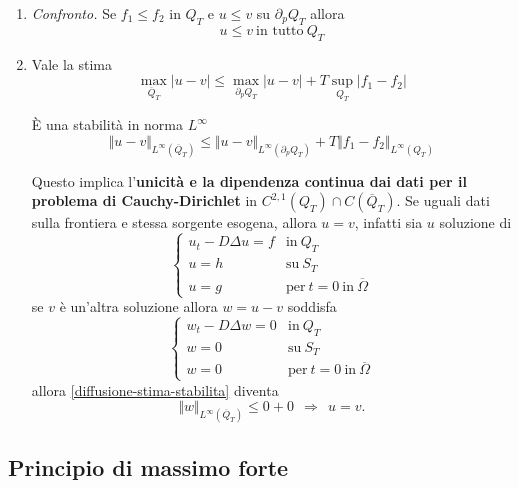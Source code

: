 \documentclass[10pt,a4paper,twoside,openright]{book}
\begin{document}
\begin{enumerate}
\item \textit{Confronto.} Se $f_{1} \leqslant f_{2}$ in $Q_{T}$ e $u\leqslant v$ su $\partial _{p} Q_{T}$ allora\begin{equation*}
u\leqslant v\ \text{in tutto} \ Q_{T}
\end{equation*}
\item Vale la stima
\begin{equation*}
\max_{\overline{Q}_{T}}| u-v| \leqslant \max_{\partial _{p} Q_{T}}| u-v| +T\sup _{Q_{T}}| f_{1} -f_{2}| 
\end{equation*}

È una stabilità in norma $L^{\infty }$
\begin{equation*}
\Vert u-v\Vert _{L^{\infty }(\overline{Q}_{T})} \leqslant \Vert u-v\Vert _{L^{\infty }( \partial _{p} Q_{T})} +T\Vert f_{1} -f_{2}\Vert _{L^{\infty }(Q_{T})}
\label{diffusione-stima-stabilita}
\end{equation*}

Questo implica l'\textbf{unicità e la dipendenza continua dai dati per il problema di Cauchy-Dirichlet} in $C^{2,1}(Q_{T}) \cap C(\overline{Q}_{T})$. Se uguali dati sulla frontiera e stessa sorgente esogena, allora $u=v$, infatti sia $u$ soluzione di\begin{equation*}
\begin{cases}
u_{t} -D\Delta u=f & \text{in} \ Q_{T}\\
u=h & \text{su} \ S_{T}\\
u=g & \text{per} \ t=0\ \text{in} \ \overline{\Omega }
\end{cases}
\end{equation*}se $v$ è un'altra soluzione allora $w=u-v$ soddisfa\begin{equation*}
\begin{cases}
w_{t} -D\Delta w=0 & \text{in} \ Q_{T}\\
w=0 & \text{su} \ S_{T}\\
w=0 & \text{per} \ t=0\ \text{in} \ \overline{\Omega }
\end{cases}
\end{equation*}
allora \eqref{diffusione-stima-stabilita} diventa
\begin{equation*}
\Vert w\Vert _{L^{\infty }(\overline{Q}_{T})} \leqslant 0+0\ \ \Rightarrow \ \ u=v.
\end{equation*}
\end{enumerate}
\subsection{Principio di massimo forte}
\end{document}
